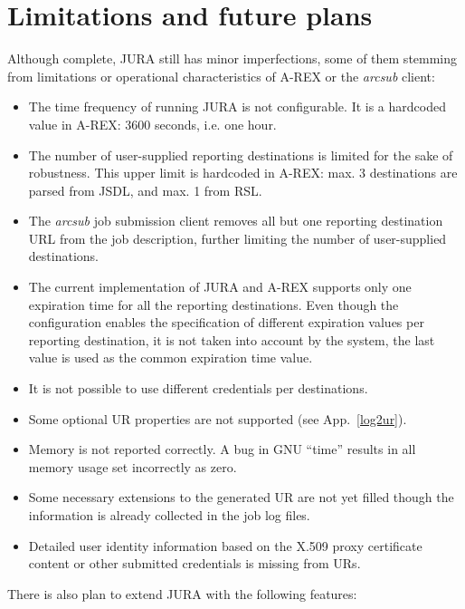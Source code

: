 \documentclass{article}                            %
\begin{document}

\section{Limitations and future plans}
\label{future}
Although complete, JURA still has minor imperfections, some of them
stemming from limitations or operational characteristics of A-REX or
the \textit{arcsub} client:

\begin{itemize}
\item The time frequency of running JURA is not configurable. It is a
  hardcoded value in A-REX: 3600 seconds, i.e. one hour. 
\item The number of user-supplied reporting destinations is limited
  for the sake of robustness. This upper limit is hardcoded in A-REX:
  max. 3 destinations are parsed from JSDL, and max. 1 from RSL.
\item The \textit{arcsub} job submission client removes all but one
  reporting destination URL from the job description, further limiting
  the number of user-supplied destinations.
\item The current implementation of JURA and A-REX supports only one
  expiration time for all the reporting destinations. Even though the
  configuration enables the specification of different expiration
  values per reporting destination, it is not taken into account by
  the system, the last value is used as the common expiration time
  value.
\item It is not possible to use different credentials per destinations.
\item Some optional UR properties are not supported (see
  App.~\ref{log2ur}).
\item Memory is not reported correctly. A bug in GNU ``time'' results
  in all memory usage set incorrectly as zero.
\item Some necessary extensions to the generated UR are not yet filled
  though the information is already collected in the job log files.
\item Detailed user identity information based on the X.509 proxy
  certificate content or other submitted credentials is missing from
  URs.
\end{itemize}

There is also plan to extend JURA with the following features:
\end{document}
